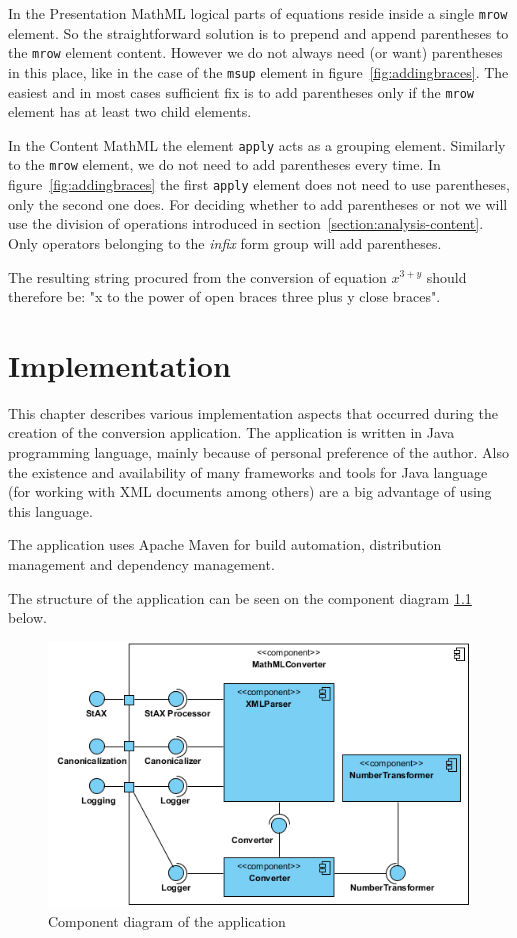 \documentclass[11pt,oneside,final]{fithesis2}
\begin{document}
In the Presentation MathML logical parts of equations reside inside a single \texttt{mrow} element. So the straightforward solution is to prepend and append parentheses to the \texttt{mrow} element content. However we do not always need (or want) parentheses in this place, like in the case of the \texttt{msup} element in figure~\ref{fig:addingbraces}. The easiest and in most cases sufficient fix is to add parentheses only if the \texttt{mrow} element has at least two child elements.

In the Content MathML the element \texttt{apply} acts as a grouping element. Similarly to the \texttt{mrow} element, we do not need to add parentheses every time. In figure~\ref{fig:addingbraces} the first \texttt{apply} element does not need to use parentheses, only the second one does. For deciding whether to add parentheses or not we will use the division of operations introduced in section~\ref{section:analysis-content}. Only operators belonging to the \textit{infix} form group will add parentheses.

The resulting string procured from the conversion of equation $x^{3+y}$ should therefore be: "x to the power of open braces three plus y close braces".

\chapter{Implementation}
This chapter describes various implementation aspects that occurred during the creation of the conversion application. The application is written in Java programming language, mainly because of personal preference of the author. Also the existence and availability of many frameworks and tools for Java language (for working with XML documents among others) are a big advantage of using this language. 

The application uses Apache Maven for build automation, distribution management and dependency management.

The structure of the application can be seen on the component diagram \ref{fig:componentdiagram} below.

\begin{figure}[!ht]
\centering
\includegraphics[width=\textwidth]{component_diagram}
\caption{Component diagram of the application}
\label{fig:componentdiagram}
\end{figure}
\end{document}
